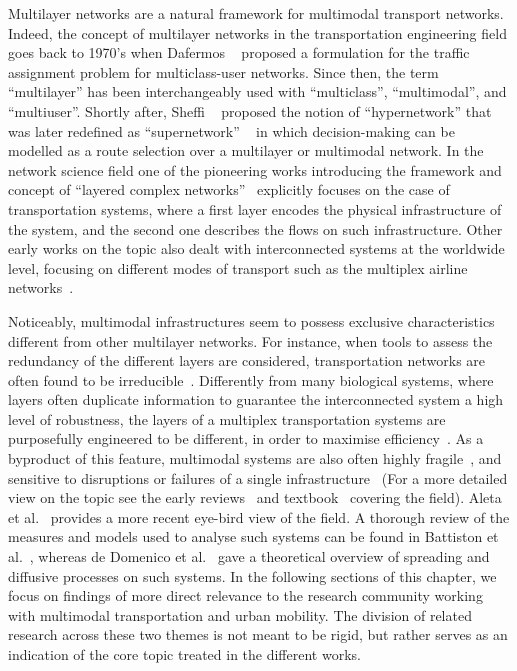 Multilayer networks are a natural framework for multimodal transport networks. Indeed, the concept of multilayer networks in the transportation engineering field goes back to 1970’s when Dafermos ~\cite{dafermos1972traffic} proposed a formulation for the traffic assignment problem for multiclass-user networks. Since then, the term ``multilayer'' has been interchangeably used with ``multiclass'', ``multimodal'', and ``multiuser''. Shortly after, Sheffi ~\cite{sheffi1978transportation} proposed the notion of ``hypernetwork'' that was later redefined as ``supernetwork'' ~\cite{sheffi1985urban} in which decision-making can be modelled as a route selection over a multilayer or multimodal network. In the network science field one of the pioneering works introducing the framework and concept of ``layered complex networks''~\cite{kurant2006layered} explicitly focuses on the case of transportation systems, where a first layer encodes the physical infrastructure of the system, and the second one describes the flows on such infrastructure. Other early works on the topic also dealt with interconnected systems at the worldwide level, focusing on different modes of transport such as the multiplex airline networks~\cite{cardillo2013emergence}.

Noticeably, multimodal infrastructures seem to possess exclusive characteristics different from other multilayer networks. For instance, when tools to assess the redundancy of the different layers are considered, transportation networks are often found to be irreducible~\cite{dedomenico2015structural}. Differently from many biological systems, where layers often duplicate information to guarantee the interconnected system a high level of robustness, the layers of a multiplex transportation systems are purposefully engineered to be different, in order to maximise efficiency~\cite{latora2001efficient}. As a byproduct of this feature, multimodal systems are also often highly fragile~\cite{buldyrev2010catastrophic}, and sensitive to disruptions or failures of a single infrastructure~\cite{dedomenico2014interconnected} (For a more detailed view on the topic see the early reviews~\cite{boccaletti2014structure, kivela2014multilayer} and textbook~\cite{bianconi2018multilayer} covering the field). Aleta et al.~\cite{aleta2019multilayer} provides a more recent eye-bird view of the field. A thorough review of the measures and models used to analyse such systems can be found in Battiston et al.~\cite{battiston2017new}, whereas de Domenico et al.~\cite{dedomenico2016physics} gave a theoretical overview of spreading and diffusive processes on such systems. In the following sections of this chapter, we focus on findings of more direct relevance to the research community working with multimodal transportation and urban mobility. The division of related research across these two themes is not meant to be rigid, but rather serves as an indication of the core topic treated in the different works. 


